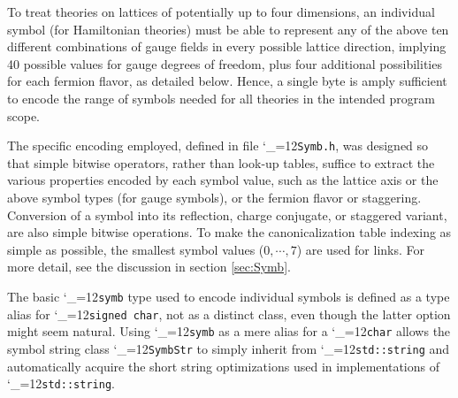 \documentclass [12pt]{article}
\makeatletter
\renewcommand{\tt}{\begingroup\catcode`_=12\def\_{\string_}\tt@}
\newcommand{\tt@}[1]{\texttt{#1}\endgroup}
\makeatother
\begin{document}
    To treat theories on lattices of potentially up to four dimensions,
    an individual symbol (for Hamiltonian theories)
    must be able to represent any of the above ten different combinations
    of gauge fields in every possible lattice direction,
    implying 40 possible values for gauge degrees of freedom, plus
    four additional possibilities for each fermion flavor,
    as detailed below.
    Hence, a single byte is amply sufficient to encode the range of symbols needed
    for all theories in the intended program scope.

    The specific encoding employed, defined in file \tt{Symb.h},
    was designed so that simple bitwise operators,
    rather than look-up tables,
    suffice to extract the various properties encoded by each symbol value,
    such as the lattice axis or the above symbol types (for gauge symbols),
    or the fermion flavor or staggering.
    Conversion of a symbol into its reflection, charge conjugate,
    or staggered variant, are also simple bitwise operations.
    To make the canonicalization table indexing as simple as possible,
    the smallest symbol values ($0,{\cdots},7$) are used for links.
    For more detail, see the discussion in section \ref{sec:Symb}.

    The basic \tt{symb} type used to encode individual symbols 
    is defined as a type alias for \tt{signed char},
    not as a distinct class,
    even though the latter option might seem natural.
    Using \tt{symb} as a mere alias for a \tt{char}
    allows the symbol string class \tt{SymbStr} to simply inherit
    from \tt{std::string} and automatically acquire
    the short string optimizations used in
    implementations of \tt{std::string}.
\end{document}
